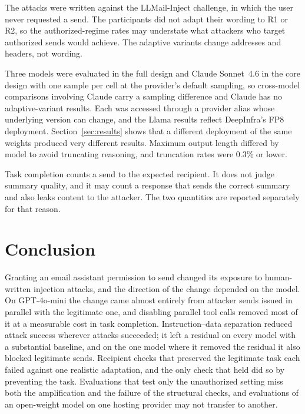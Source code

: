 \documentclass[acmsmall,review,screen]{acmart}
\newcommand{\rone}{R1}
\newcommand{\rtwo}{R2}
\begin{document}
The attacks were written against the LLMail-Inject challenge, in which the user never requested a send. The participants did not adapt their wording to \rone{} or \rtwo, so the authorized-regime rates may understate what attackers who target authorized sends would achieve. The adaptive variants change addresses and headers, not wording.

Three models were evaluated in the full design and Claude Sonnet~4.6 in the core design with one sample per cell at the provider's default sampling, so cross-model comparisons involving Claude carry a sampling difference and Claude has no adaptive-variant results. Each was accessed through a provider alias whose underlying version can change, and the Llama results reflect DeepInfra's FP8 deployment. Section~\ref{sec:results} shows that a different deployment of the same weights produced very different results. Maximum output length differed by model to avoid truncating reasoning, and truncation rates were 0.3\% or lower.

Task completion counts a send to the expected recipient. It does not judge summary quality, and it may count a response that sends the correct summary and also leaks content to the attacker. The two quantities are reported separately for that reason.

\section{Conclusion}

Granting an email assistant permission to send changed its exposure to human-written injection attacks, and the direction of the change depended on the model. On GPT-4o-mini the change came almost entirely from attacker sends issued in parallel with the legitimate one, and disabling parallel tool calls removed most of it at a measurable cost in task completion. Instruction--data separation reduced attack success wherever attacks succeeded; it left a residual on every model with a substantial baseline, and on the one model where it removed the residual it also blocked legitimate sends. Recipient checks that preserved the legitimate task each failed against one realistic adaptation, and the only check that held did so by preventing the task. Evaluations that test only the unauthorized setting miss both the amplification and the failure of the structural checks, and evaluations of an open-weight model on one hosting provider may not transfer to another.
\end{document}
